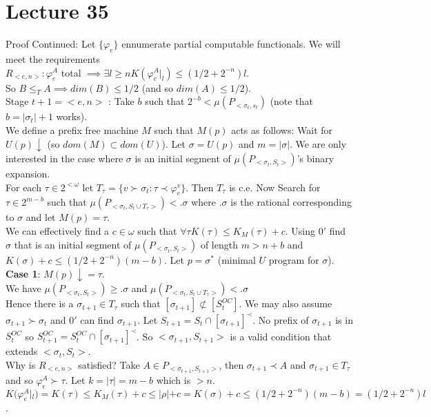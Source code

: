 \documentclass{article}
\begin{document}
   \section{Lecture 35}
   Proof Continued: Let $\{\varphi_e\}$ ennumerate partial computable functionals. We will meet the requirements \\$R_{<e,n>}: \varphi_e^A$ total $\implies \exists l\geq n K(\varphi_e^A|_l) \leq (1/2+2^{-n})l$. \\So $B \leq_T A \implies dim(B) \leq 1/2$ (and so $dim(A) \leq 1/2$).\\
   Stage $t+1 = <e,n>$ : Take $b$ such that $2^{-b} < \mu(P_{<\sigma_t, s_t})$ (note that $b= |\sigma_t|+1$ works).\\
   We define a prefix free machine $M$ such that $M(p)$ acts as follows: Wait for $U(p) \downarrow$ (so $dom(M) \subset dom(U)$). Let $\sigma = U(p)$ and $m=|\sigma|$. We are only interested in the case where $\sigma$ is an initial segment of $\mu(P_{<\sigma_t,S_t>})$'s binary expansion.\\
   For each $\tau \in 2^{<\omega}$ let $T_\tau = \{v \succ \sigma_t : \tau \prec \varphi_e^v\}$. Then $T_\tau$ is c.e. Now Search for $\tau \in 2^{m-b}$ such that $\mu(P_{<\sigma_t, S_t \cup T_\tau> })< .\sigma$ where $.\sigma$ is the rational corresponding to $\sigma$ and let $M(p) = \tau$.\\
   We can effectively find a $c \in \omega$ such that $\forall \tau K(\tau) \leq K_M(\tau) + c$. Using $0'$ find $\sigma$ that is an initial segment of $\mu(P_{<\sigma_t,S_t>})$ of length $m> n+b$ and $K(\sigma)+ c \leq( 1/2 + 2^{-n})(m-b)$. Let $p = \sigma^* $ (minimal $U$ program for $\sigma$).\\
   \textbf{Case 1}: $M(p) \downarrow = \tau$. \\
   We have $\mu(P_{<\sigma_t,S_t>}) \geq .\sigma$ and $\mu(P_{<\sigma_t, S_t \cup T_\tau>}) < .\sigma$ \\
   Hence there is a $\sigma_{t+1} \in T_\tau$ such that $[\sigma_{t+1}] \not \subset [S^{OC}_t]$. We may also assume $\sigma_{t+1} \succ \sigma_t$ and $0'$ can find $\sigma_{t+1}$. Let $S_{t+1} = S_t \cap [\sigma_{t+1}]^\prec$. No prefix of $\sigma_{t+1}$ is in $S_t^{OC}$ so $S^{OC}_{t+1} = S^{OC}_t \cap [\sigma_{t+1}]^\prec$. So $<\sigma_{t+1},S_{t+1}>$ is a valid condition that extends $<\sigma_t,S_t>$.\\
   Why is $R_{<e,n>}$ satisfied? Take $A \in P_{<\sigma_{t+1},S_{t+1}>}$, then $\sigma_{t+1} \prec A$ and $\sigma_{t+1} \in T_\tau$ and so $\varphi_e^A \succ \tau$. Let $k = |\tau| = m-b$ which is $> n$. $K(\varphi_e^A|_l) = K(\tau) \leq K_M(\tau)+c \leq |\rho| + c = K(\sigma) + c \leq (1/2+2^{-n})(m-b) = (1/2+2^{-n})l$.\\
\end{document}
